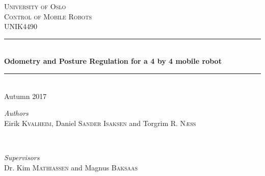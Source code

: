 \documentclass[a4paper,10pt]{article}
\begin{document}

\begin{titlepage} %
	\newcommand{\HRule}{\rule{\linewidth}{0.5mm}} %
	
	\center %
	

	
	\textsc{\LARGE University of Oslo}\\[1.5cm] %
	
	\textsc{\Large Control of Mobile Robots}\\[0.5cm] %
	
	\textsc{\large UNIK4490}\\[0.5cm] %
	
	
	\HRule\\[0.4cm]
	
	{\huge\bfseries Odometry and Posture Regulation for a 4 by 4 mobile robot}\\[0.4cm] %
	\HRule\\[0.8cm]
	{\large{Autumn 2017}} %
	\vspace{1cm}
	
	\begin{minipage}{0.4\textwidth}
		\begin{flushleft}
			\large
			\textit{Authors}\\
			Eirik \textsc{Kvalheim}, Daniel \textsc{Sander Isaksen} and Torgrim \textsc{R. Næss}
		\end{flushleft}
	\end{minipage}
	~
	\begin{minipage}{0.4\textwidth}
		\begin{flushright}
			\large
			\textit{Supervisors}\\
			Dr. Kim \textsc{Mathiassen} and Magnus \textsc{Baksaas}
		\end{flushright}
	\end{minipage}
	

\end{titlepage}
\end{document}
